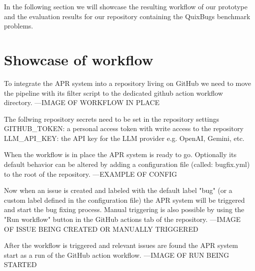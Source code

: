 In the following section we will showcase the resulting workflow of our prototype and the evaluation results for our repository containing the QuixBugs benchmark problems.
\section{Showcase of workflow}
To integrate the APR system into a repository living on GitHub we need to move the pipeline with its filter script to the dedicated github action workflow directory.
---IMAGE OF WORKFLOW IN PLACE

The follwing repository secrets need to be set in the repository settings GITHUB\_TOKEN: a personal access token with write access to the repository LLM\_API\_KEY: the API key for the LLM provider e.g. OpenAI, Gemini, etc.

When the workflow is in place the APR system is ready to go. Optionally its default behavior can be altered by adding a configuration file (called: bugfix.yml) to the root of the repository.
---EXAMPLE OF CONFIG

Now when an issue is created and labeled with the default label "bug" (or a custom label defined in the configuration file) the APR system will be triggered and start the bug fixing process. Manual triggering is also possible by using the "Run workflow" button in the GitHub actions tab of the repository.
---IMAGE OF ISSUE BEING CREATED OR MANUALLY TRIGGERED

After the workflow is triggered and relevant issues are found the APR system start as a run of the GitHub action workflow.
---IMAGE OF RUN BEING STARTED


